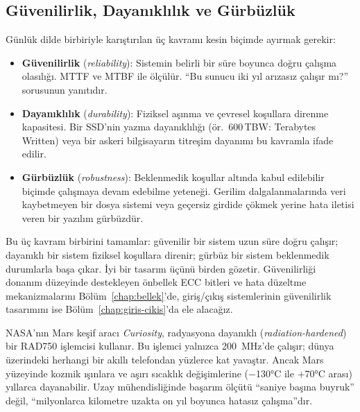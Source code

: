 \subsection{Güvenilirlik, Dayanıklılık ve Gürbüzlük}
\label{subsec:guvenilirlik-dayaniklilik-gurbuzluk}

Günlük dilde birbiriyle karıştırılan üç kavramı kesin biçimde ayırmak gerekir:
\begin{itemize}
    \item \textbf{Güvenilirlik} (\emph{reliability}): Sistemin belirli bir süre boyunca doğru çalışma olasılığı. MTTF ve MTBF ile ölçülür. ``Bu sunucu iki yıl arızasız çalışır mı?'' sorusunun yanıtıdır.
    \item \textbf{Dayanıklılık} (\emph{durability}): Fiziksel aşınma ve çevresel koşullara direnme kapasitesi. Bir SSD'nin yazma dayanıklılığı (ör.\ 600\,TBW: Terabytes Written) veya bir askeri bilgisayarın titreşim dayanımı bu kavramla ifade edilir.
    \item \textbf{Gürbüzlük} (\emph{robustness}): Beklenmedik koşullar altında kabul edilebilir biçimde çalışmaya devam edebilme yeteneği. Gerilim dalgalanmalarında veri kaybetmeyen bir dosya sistemi veya geçersiz girdide çökmek yerine hata iletisi veren bir yazılım gürbüzdür.
\end{itemize}

Bu üç kavram birbirini tamamlar: güvenilir bir sistem uzun süre doğru çalışır; dayanıklı bir sistem fiziksel koşullara direnir; gürbüz bir sistem beklenmedik durumlarla başa çıkar. İyi bir tasarım üçünü birden gözetir. Güvenilirliği donanım düzeyinde destekleyen önbellek ECC bitleri ve hata düzeltme mekanizmalarını Bölüm~\ref{chap:bellek}'de, giriş/çıkış sistemlerinin güvenilirlik tasarımını ise Bölüm~\ref{chap:giris-cikis}'da ele alacağız.

\begin{bilginot}
NASA'nın Mars keşif aracı \emph{Curiosity}, radyasyona dayanıklı (\emph{radiation-hardened}) bir RAD750 işlemcisi kullanır. Bu işlemci yalnızca 200~MHz'de çalışır; dünya üzerindeki herhangi bir akıllı telefondan yüzlerce kat yavaştır. Ancak Mars yüzeyinde kozmik ışınlara ve aşırı sıcaklık değişimlerine ($-$130°C ile $+$70°C arası) yıllarca dayanabilir. Uzay mühendisliğinde başarım ölçütü ``saniye başına buyruk'' değil, ``milyonlarca kilometre uzakta on yıl boyunca hatasız çalışma''dır.
\end{bilginot}


